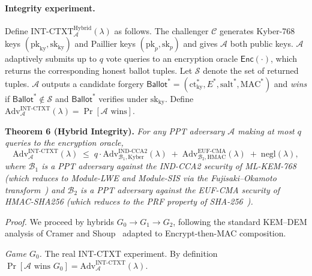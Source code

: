 \paragraph{Integrity experiment.} Define $\mathrm{INT\text{-}CTXT}^{\text{Hybrid}}_{\mathcal{A}}(\lambda)$ as follows. The challenger $\mathcal{C}$ generates Kyber-768 keys $(\text{pk}_{\text{ky}}, \text{sk}_{\text{ky}})$ and Paillier keys $(\text{pk}_p, \text{sk}_p)$ and gives $\mathcal{A}$ both public keys. $\mathcal{A}$ adaptively submits up to $q$ vote queries to an encryption oracle $\mathsf{Enc}(\cdot)$, which returns the corresponding honest ballot tuples. Let $\mathcal{S}$ denote the set of returned tuples. $\mathcal{A}$ outputs a candidate forgery $\mathsf{Ballot}^* = (\text{ct}_{\text{ky}}^*, E^*, \text{salt}^*, \text{MAC}^*)$ and \emph{wins} if $\mathsf{Ballot}^* \notin \mathcal{S}$ and $\mathsf{Ballot}^*$ verifies under $\text{sk}_{\text{ky}}$. Define $\mathrm{Adv}^{\mathrm{INT\text{-}CTXT}}_{\mathcal{A}}(\lambda) = \Pr[\mathcal{A} \text{ wins}]$.

\textbf{Theorem 6 (Hybrid Integrity).} \textit{For any PPT adversary $\mathcal{A}$ making at most $q$ queries to the encryption oracle,}
\begin{equation}
    \mathrm{Adv}^{\mathrm{INT\text{-}CTXT}}_{\mathcal{A}}(\lambda) \;\leq\; q \cdot \mathrm{Adv}^{\mathrm{IND\text{-}CCA2}}_{\mathcal{B}_1, \mathrm{Kyber}}(\lambda) \;+\; \mathrm{Adv}^{\mathrm{EUF\text{-}CMA}}_{\mathcal{B}_2, \mathrm{HMAC}}(\lambda) \;+\; \mathrm{negl}(\lambda),
    \label{eq:t6-bound}
\end{equation}
\textit{where $\mathcal{B}_1$ is a PPT adversary against the IND-CCA2 security of ML-KEM-768 (which reduces to Module-LWE and Module-SIS via the Fujisaki--Okamoto transform~\cite{hofheinz2017fo,nist_kyber}) and $\mathcal{B}_2$ is a PPT adversary against the EUF-CMA security of HMAC-SHA256 (which reduces to the PRF property of SHA-256~\cite{rfc2104,nist_fips198}).}

\textit{Proof.} We proceed by hybrids $G_0 \to G_1 \to G_2$, following the standard KEM--DEM analysis of Cramer and Shoup~\cite{cramer2003kemdem} adapted to Encrypt-then-MAC composition.

\emph{Game $G_0$.} The real INT-CTXT experiment. By definition $\Pr[\mathcal{A} \text{ wins } G_0] = \mathrm{Adv}^{\mathrm{INT\text{-}CTXT}}_{\mathcal{A}}(\lambda)$.


